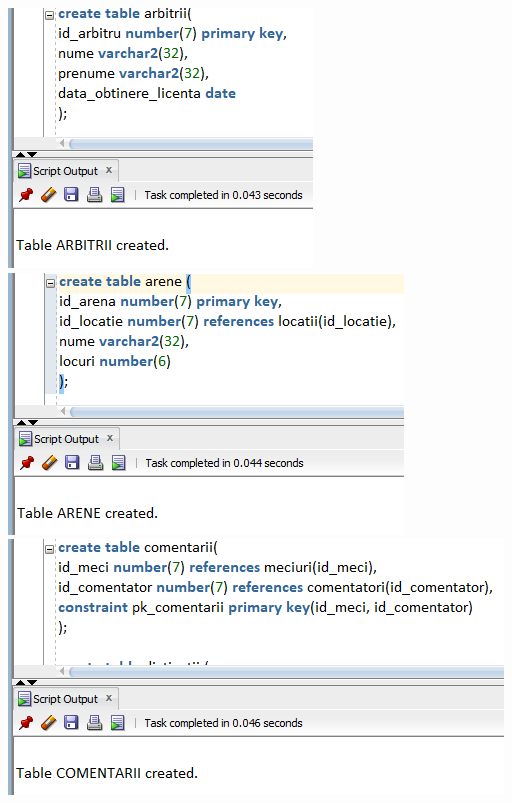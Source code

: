 \documentclass{article}
\begin{document}
\begin{multicols*}{4}
\vspace{4em}
\includegraphics[width=\linewidth]{creation/arbitrii}
\vspace{4em}
\includegraphics[width=\linewidth]{creation/arene}
\vspace{4em}
\includegraphics[width=\linewidth]{creation/comentarii}

\end{multicols*}
\end{document}

